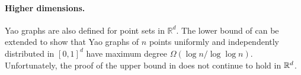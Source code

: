 \documentclass[10pt]{llncs}
\newcommand{\RR}{\mathbb{R}}
\begin{document}
\paragraph{Higher dimensions.}  
Yao graphs are also defined for point sets in $\RR^d$.  The lower bound
of  can be extended to show that Yao graphs of
$n$ points uniformly and independently distributed in $[0,1]^d$ have
maximum degree $\Omega(\log n/\log\log n)$. Unfortunately, the proof of
the upper bound in  does not continue to hold
in $\mathbb{R}^d$.




\nocite{*}

\end{document}
